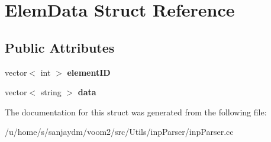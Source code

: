 \hypertarget{struct_elem_data}{
\section{ElemData Struct Reference}
\label{struct_elem_data}
}
\subsection*{Public Attributes}
\begin{DoxyCompactItemize}
\item 
\hypertarget{struct_elem_data_ae78d3b406ae14e787d8619fb534d4f84}{
vector$<$ int $>$ {\bfseries elementID}}
\label{struct_elem_data_ae78d3b406ae14e787d8619fb534d4f84}

\item 
\hypertarget{struct_elem_data_ae3ce70b8de33840dd0f1346bc8b5e19d}{
vector$<$ string $>$ {\bfseries data}}
\label{struct_elem_data_ae3ce70b8de33840dd0f1346bc8b5e19d}

\end{DoxyCompactItemize}


The documentation for this struct was generated from the following file:\begin{DoxyCompactItemize}
\item 
/u/home/s/sanjaydm/voom2/src/Utils/inpParser/inpParser.cc\end{DoxyCompactItemize}
